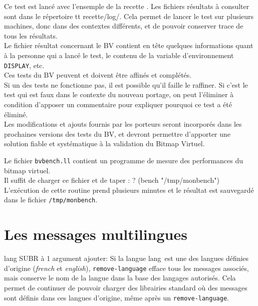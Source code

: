Ce test est lanc\'{e} avec l'ensemple de la recette \LeLisp. Les fichiers
r\'{e}sultats \`{a} consulter sont dans le r\'{e}pertoire {tt recette/log/}.
Cela permet de lancer le test sur plusieurs machines, donc dans des contextes
diff\'{e}rents, et de pouvoir conserver trace de tous les r\'{e}sultats.\\
Le fichier r\'{e}sultat concernant le BV
contient en t\^{e}te quelques informations quant \`{a} la
personne qui a lanc\'{e} le test, le contenu de la variable d'environnement
{\tt DISPLAY}, etc.\\


Ces tests du BV peuvent et doivent \^{e}tre affin\'{e}s et compl\'{e}t\'{e}s.\\
Si un des tests ne fonctionne pas, il est possible qu'il faille le raffiner.
Si c'est le test qui est faux dans le contexte du nouveau portage, on peut
l'\'{e}liminer \`{a} condition d'apposer un commentaire pour expliquer pourquoi
ce test a \'{e}t\'{e} \'{e}limin\'{e}.\\
Les modifications et ajouts fournis par les porteurs seront incorpor\'{e}s dans
les prochaines versions des tests du BV, et devront permettre d'apporter une
solution fiable et syst\'{e}matique \`{a} la validation du Bitmap Virtuel.




Le fichier {\tt bvbench.ll} contient un programme de mesure des performances
du bitmap virtuel.\\
Il suffit de charger ce fichier et de taper :
\BeginLL
? (bench "/tmp/monbench")
\EndLL
L'ex\'{e}cution de cette routine prend plusieurs minutes et le r\'{e}sultat est
sauvegard\'{e} dans le fichier {\tt /tmp/monbench}.


\chapter {Les messages multilingues}


 {lang} {SUBR \`{a} 1 argument}
ajouter:
Si la langue \LT lang\GT\ est une des langues d\'{e}finies d'origine
({\em french} et {\em english}), {\tt remove-language} efface tous les
messages associ\'{e}s, mais conserve le nom de la langue dans la base des
langages autoris\'{e}s. Cela permet de continuer de pouvoir charger des
librairies standard o\`{u} des messages sont d\'{e}finis dans ces langues
d'origine, m\^{e}me apr\`{e}s un {\tt remove-language}. 


